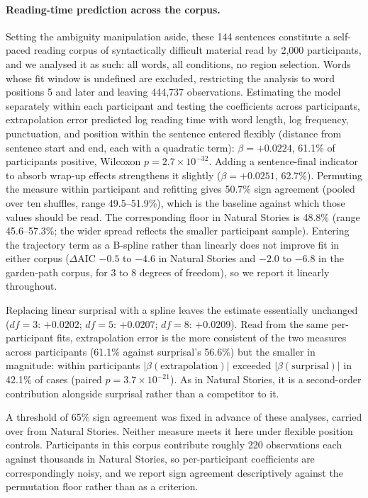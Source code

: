 \documentclass[12pt]{article}
\begin{document}
{\paragraph{Reading-time prediction across the corpus.} Setting the ambiguity manipulation aside, these 144 sentences constitute a self-paced reading corpus of syntactically difficult material read by 2,000 participants, and we analysed it as such: all words, all conditions, no region selection. Words whose fit window is undefined are excluded, restricting the analysis to word positions 5 and later and leaving 444,737 observations. Estimating the model separately within each participant and testing the coefficients across participants, extrapolation error predicted log reading time with word length, log frequency, punctuation, and position within the sentence entered flexibly (distance from sentence start and end, each with a quadratic term): $\beta = +0.0224$, 61.1\% of participants positive, Wilcoxon $p = 2.7 \times 10^{-32}$. Adding a sentence-final indicator to absorb wrap-up effects strengthens it slightly ($\beta = +0.0251$, 62.7\%). Permuting the measure within participant and refitting gives 50.7\% sign agreement (pooled over ten shuffles, range 49.5--51.9\%), which is the baseline against which those values should be read. The corresponding floor in Natural Stories is 48.8\% (range 45.6--57.3\%; the wider spread reflects the smaller participant sample). Entering the trajectory term as a B-spline rather than linearly does not improve fit in either corpus ($\Delta$AIC $-0.5$ to $-4.6$ in Natural Stories and $-2.0$ to $-6.8$ in the garden-path corpus, for 3 to 8 degrees of freedom), so we report it linearly throughout.

Replacing linear surprisal with a spline leaves the estimate essentially unchanged ($df = 3$: $+0.0202$; $df = 5$: $+0.0207$; $df = 8$: $+0.0209$). Read from the same per-participant fits, extrapolation error is the more consistent of the two measures across participants (61.1\% against surprisal's 56.6\%) but the smaller in magnitude: within participants $|\beta(\text{extrapolation})|$ exceeded $|\beta(\text{surprisal})|$ in 42.1\% of cases (paired $p = 3.7 \times 10^{-21}$). As in Natural Stories, it is a second-order contribution alongside surprisal rather than a competitor to it.

A threshold of 65\% sign agreement was fixed in advance of these analyses, carried over from Natural Stories. Neither measure meets it here under flexible position controls. Participants in this corpus contribute roughly 220 observations each against thousands in Natural Stories, so per-participant coefficients are correspondingly noisy, and we report sign agreement descriptively against the permutation floor rather than as a criterion.

}
\end{document}
